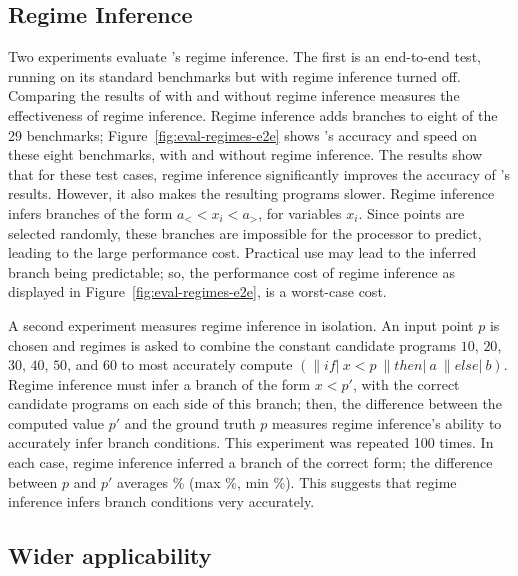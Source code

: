 \documentclass[paper.tex]{subfiles}
\begin{document}
\subsection{Regime Inference} \label{sec:eval-regimes}

Two experiments evaluate \casio's regime inference.  The first is an
end-to-end test, running \casio on its standard benchmarks but with
regime inference turned off.  Comparing the results of \casio with and
without regime inference measures the effectiveness of regime
inference.  Regime inference adds branches to eight of the 29
benchmarks; Figure~\ref{fig:eval-regimes-e2e} shows \casio's accuracy
and speed on these eight benchmarks, with and without regime
inference.  The results show that for these test cases, regime
inference significantly improves the accuracy of \casio's results.
However, it also makes the resulting programs slower.  Regime
inference infers branches of the form $a_< < x_i < a_>$, for variables
$x_i$.  Since points are selected randomly, these branches are
impossible for the processor to predict, leading to the large
performance cost.  Practical use may lead to the inferred branch being
predictable; so, the performance cost of regime inference as displayed
in Figure~\ref{fig:eval-regimes-e2e}, is a worst-case cost.

A second experiment measures regime inference in isolation.  An input
point $p$ is chosen and regimes is asked to combine the constant
candidate programs $10$, $20$, $30$, $40$, $50$, and $60$ to most
accurately compute $(\|if|\:x < p\:\|then|\:a\:\|else|\:b)$.
 Regime inference must
infer a branch of the form $x < p'$, with the correct candidate
programs on each side of this branch; then, the difference between the
computed value $p'$ and the ground truth $p$ measures regime
inference's ability to accurately infer branch conditions.  This
experiment was repeated 100 times.  In each case, regime inference
inferred a branch of the correct form; the difference between $p$ and
$p'$ averages \% (max \%, min \%).  This
suggests that regime inference infers branch conditions very
accurately.

\subsection{Wider applicability}
\end{document}
